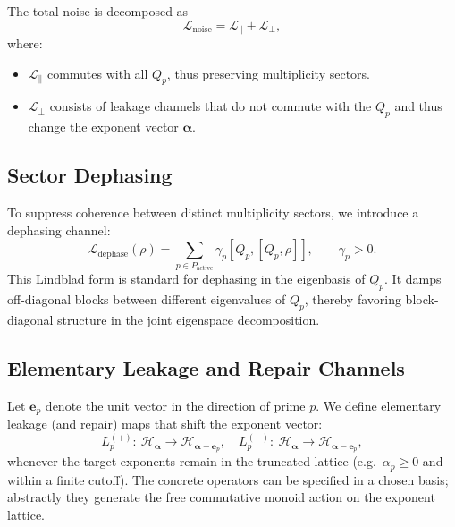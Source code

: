 \documentclass[11pt]{article}
\begin{document}
The total noise is decomposed as
\begin{equation}
  \mathcal L_{\text{noise}}
  = \mathcal L_{\parallel} + \mathcal L_{\perp},
\end{equation}
where:
\begin{itemize}[leftmargin=*]
  \item $\mathcal L_{\parallel}$ commutes with all $Q_p$, thus preserving
        multiplicity sectors.
  \item $\mathcal L_{\perp}$ consists of leakage channels that do not commute
        with the $Q_p$ and thus change the exponent vector
        $\boldsymbol\alpha$.
\end{itemize}

\subsection{Sector Dephasing}

To suppress coherence between distinct multiplicity sectors, we introduce a
dephasing channel:
\begin{equation}
  \mathcal L_{\text{dephase}}(\rho)
  = \sum_{p \in P_{\text{active}}}
      \gamma_p [Q_p, [Q_p, \rho]],
  \qquad \gamma_p > 0.
\end{equation}
This Lindblad form is standard for dephasing in the eigenbasis of
$Q_p$. It damps off-diagonal blocks between different eigenvalues of $Q_p$,
thereby favoring block-diagonal structure in the joint eigenspace
decomposition.

\subsection{Elementary Leakage and Repair Channels}

Let $\boldsymbol e_p$ denote the unit vector in the direction of prime $p$.
We define elementary leakage (and repair) maps that shift the exponent vector:
\begin{equation}
  L_p^{(+)}:\ \mathcal H_{\boldsymbol\alpha}
  \to \mathcal H_{\boldsymbol\alpha + \boldsymbol e_p}, \quad
  L_p^{(-)}:\ \mathcal H_{\boldsymbol\alpha}
  \to \mathcal H_{\boldsymbol\alpha - \boldsymbol e_p},
\end{equation}
whenever the target exponents remain in the truncated lattice (e.g.\ 
$\alpha_p \ge 0$ and within a finite cutoff). The concrete operators can be
specified in a chosen basis; abstractly they generate the free commutative
monoid action on the exponent lattice.
\end{document}
